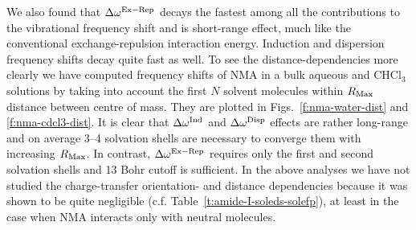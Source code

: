 \documentclass[b5paper,oneside,fleqn,11pt]{book}
\begin{document}
\begin{refsection}
We also found that $\Delta\omega^{\rm Ex-Rep}$
decays the fastest among all the contributions to the vibrational frequency shift
and is short\hyp{}range effect, much like the conventional exchange\hyp{}repulsion interaction energy.
Induction and dispersion frequency shifts decay quite fast as well. To see the
distance\hyp{}dependencies more clearly we have computed frequency shifts
of NMA in a bulk aqueous and CHCl$_3$ solutions by taking into account
the first $N$ solvent molecules within $R_{\rm Max}$ distance between centre of
mass. They are plotted in Figs.~\ref{f:nma-water-dist} and \ref{f:nma-cdcl3-dist}. 
It is clear that $\Delta\omega^{\rm Ind}$
and $\Delta\omega^{\rm Disp}$ effects are rather long\hyp{}range
and on average 3--4 solvation shells are necessary to converge them with increasing $R_{\rm Max}$.
In contrast, $\Delta\omega^{\rm Ex-Rep}$ requires only the first and second solvation
shells and 13 Bohr cutoff is sufficient. In the above analyses we have not studied
the charge\hyp{}transfer orientation\hyp{} and distance dependencies
because it was shown to be quite negligible (c.f.
Table~\ref{t:amide-I-soleds-solefp}), at least in the case when
NMA interacts only with neutral molecules.

%


\end{refsection}
\end{document}
